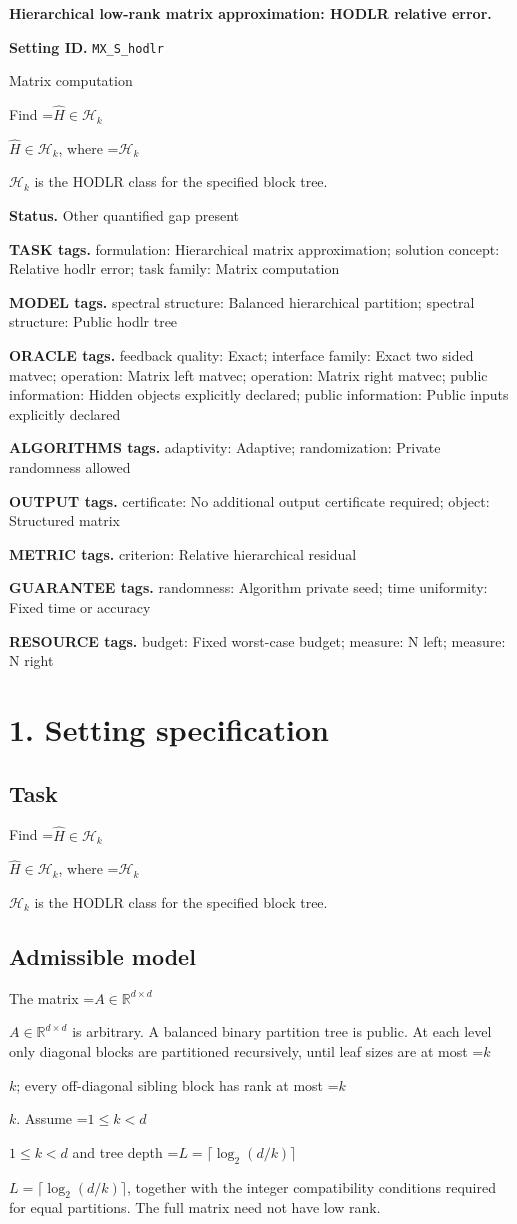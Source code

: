 \documentclass[10pt,a4paper]{article}
\newcommand{\AtlasMath}[1]{\par\begingroup\centering\setbox0=\hbox{$\displaystyle #1$}\ifdim\wd0>1.4\linewidth\typeout{ATLAS WIDE FORMULA: \the\wd0}\fi\ifdim\wd0>\linewidth\resizebox{\linewidth}{!}{\box0}\else\box0\fi\par\endgroup}
\newcommand{\AtlasInlineMath}[1]{\begingroup\setbox0=\hbox{$#1$}\ifdim\wd0>.4\linewidth\endgroup\AtlasMath{#1}\else\endgroup$#1$\fi}
\begin{document}
\raggedright

{\LARGE\bfseries\sffamily\color{AtlasNavy} Hierarchical low-rank matrix approximation: HODLR relative error.\par}\vspace{5pt}
\textbf{Setting ID.} \texttt{MX\_\allowbreak{}S\_\allowbreak{}hodlr}

Matrix computation

Find \AtlasInlineMath{\widehat{H}\in\mathcal{H}_k}, where \AtlasInlineMath{\mathcal{H}_k} is the HODLR class for the specified block tree.

\textbf{Status.} Other quantified gap present

\textbf{TASK tags.} formulation: Hierarchical matrix approximation; solution concept: Relative hodlr error; task family: Matrix computation

\textbf{MODEL tags.} spectral structure: Balanced hierarchical partition; spectral structure: Public hodlr tree

\textbf{ORACLE tags.} feedback quality: Exact; interface family: Exact two sided matvec; operation: Matrix left matvec; operation: Matrix right matvec; public information: Hidden objects explicitly declared; public information: Public inputs explicitly declared

\textbf{ALGORITHMS tags.} adaptivity: Adaptive; randomization: Private randomness allowed

\textbf{OUTPUT tags.} certificate: No additional output certificate required; object: Structured matrix

\textbf{METRIC tags.} criterion: Relative hierarchical residual

\textbf{GUARANTEE tags.} randomness: Algorithm private seed; time uniformity: Fixed time or accuracy

\textbf{RESOURCE tags.} budget: Fixed worst-case budget; measure: N left; measure: N right

\section{1. Setting specification}
\subsection{Task}
Find \AtlasInlineMath{\widehat{H}\in\mathcal{H}_k}, where \AtlasInlineMath{\mathcal{H}_k} is the HODLR class for the specified block tree.

\subsection{Admissible model}
The matrix \AtlasInlineMath{A\in\mathbb{R}^{d\times d}} is arbitrary. A balanced binary partition tree is public. At each level only diagonal blocks are partitioned recursively, until leaf sizes are at most \AtlasInlineMath{k}; every off-diagonal sibling block has rank at most \AtlasInlineMath{k}. Assume \AtlasInlineMath{1\le k<d} and tree depth \AtlasInlineMath{L=\lceil\log_2(d/k)\rceil}, together with the integer compatibility conditions required for equal partitions. The full matrix need not have low rank.
\end{document}
